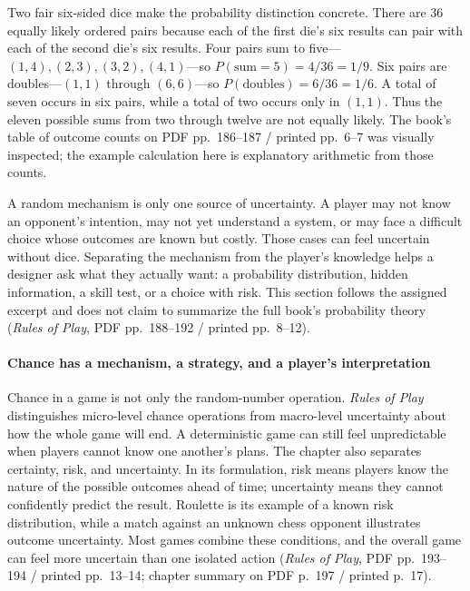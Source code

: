 Two fair six-sided dice make the probability distinction concrete. There are 36 equally likely ordered pairs because each of the first die's six results can pair with each of the second die's six results. Four pairs sum to five---\((1,4),(2,3),(3,2),(4,1)\)---so \(P(\text{sum}=5)=4/36=1/9\). Six pairs are doubles---\((1,1)\) through \((6,6)\)---so \(P(\text{doubles})=6/36=1/6\). A total of seven occurs in six pairs, while a total of two occurs only in \((1,1)\). Thus the eleven possible sums from two through twelve are not equally likely. The book's table of outcome counts on PDF pp.~186--187 / printed pp.~6--7 was visually inspected; the example calculation here is explanatory arithmetic from those counts.

A random mechanism is only one source of uncertainty. A player may not know an opponent's intention, may not yet understand a system, or may face a difficult choice whose outcomes are known but costly. Those cases can feel uncertain without dice. Separating the mechanism from the player's knowledge helps a designer ask what they actually want: a probability distribution, hidden information, a skill test, or a choice with risk. This section follows the assigned excerpt and does not claim to summarize the full book's probability theory (\emph{Rules of Play}, PDF pp.~188--192 / printed pp.~8--12).

\paragraph{Chance has a mechanism, a strategy, and a player's interpretation}\label{05-engine-i-ch009-chance-has-a-mechanism-a-strategy-and-a-players-interpretation}

\hypertarget{05-engine-i-ch009-chance-has-a-mechanism-a-strategy-and-a-players-interpretation}{}

Chance in a game is not only the random-number operation. \emph{Rules of Play} distinguishes micro-level chance operations from macro-level uncertainty about how the whole game will end. A deterministic game can still feel unpredictable when players cannot know one another's plans. The chapter also separates certainty, risk, and uncertainty. In its formulation, risk means players know the nature of the possible outcomes ahead of time; uncertainty means they cannot confidently predict the result. Roulette is its example of a known risk distribution, while a match against an unknown chess opponent illustrates outcome uncertainty. Most games combine these conditions, and the overall game can feel more uncertain than one isolated action (\emph{Rules of Play}, PDF pp.~193--194 / printed pp.~13--14; chapter summary on PDF p.~197 / printed p.~17).

